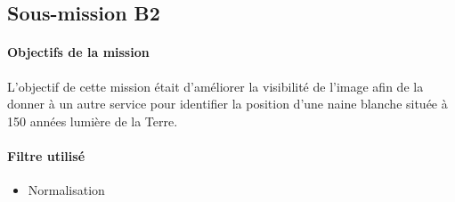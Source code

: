 \documentclass[12pt]{article}
\begin{document}
\newpage

	\subsection{Sous-mission B2} 

	\begin{vwcol}[widths={0.8,0.2}, rule=0pt]
	\begin{minipage}{0.7\textwidth}
	\paragraph{Objectifs de la mission}

	L'objectif de cette mission était d'améliorer la visibilité de l'image afin de la donner à un autre service pour identifier la position d'une naine blanche située à 150 années lumière de la Terre.
	\end{minipage}
	\begin{minipage}{0.2\textwidth}
	\paragraph{Filtre utilisé}

	\begin{itemize}
		\item Normalisation
	\end{itemize}
	\end{minipage}
	\end{vwcol} 
\end{document}
